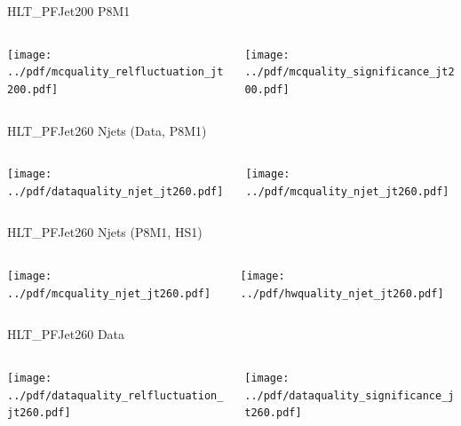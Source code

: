\documentclass[9pt]{beamer}
\begin{document}
\begin{frame}[t]{HLT\_PFJet200 P8M1}
\begin{columns}[T]
  \begin{column}{.5\textwidth}
  \texttt{[image: ../pdf/mcquality\_relfluctuation\_jt200.pdf]}
  \end{column}
  \begin{column}{.5\textwidth}
  \texttt{[image: ../pdf/mcquality\_significance\_jt200.pdf]}
  \end{column}
\end{columns}
\end{frame}


\begin{frame}[t]{HLT\_PFJet260 Njets (Data, P8M1)}
\begin{columns}[T]
  \begin{column}{.5\textwidth}
  \texttt{[image: ../pdf/dataquality\_njet\_jt260.pdf]}
  \end{column}
  \begin{column}{.5\textwidth}
  \texttt{[image: ../pdf/mcquality\_njet\_jt260.pdf]}
  \end{column}
\end{columns}
\end{frame}

\begin{frame}[t]{HLT\_PFJet260 Njets (P8M1, HS1)}
\begin{columns}[T]
  \begin{column}{.5\textwidth}
  \texttt{[image: ../pdf/mcquality\_njet\_jt260.pdf]}
  \end{column}
  \begin{column}{.5\textwidth}
  \texttt{[image: ../pdf/hwquality\_njet\_jt260.pdf]}
  \end{column}
\end{columns}
\end{frame}

\begin{frame}[t]{HLT\_PFJet260 Data}
\begin{columns}[T]
  \begin{column}{.5\textwidth}
  \texttt{[image: ../pdf/dataquality\_relfluctuation\_jt260.pdf]}
  \end{column}
  \begin{column}{.5\textwidth}
  \texttt{[image: ../pdf/dataquality\_significance\_jt260.pdf]}
  \end{column}
\end{columns}
\end{frame}
\end{document}
